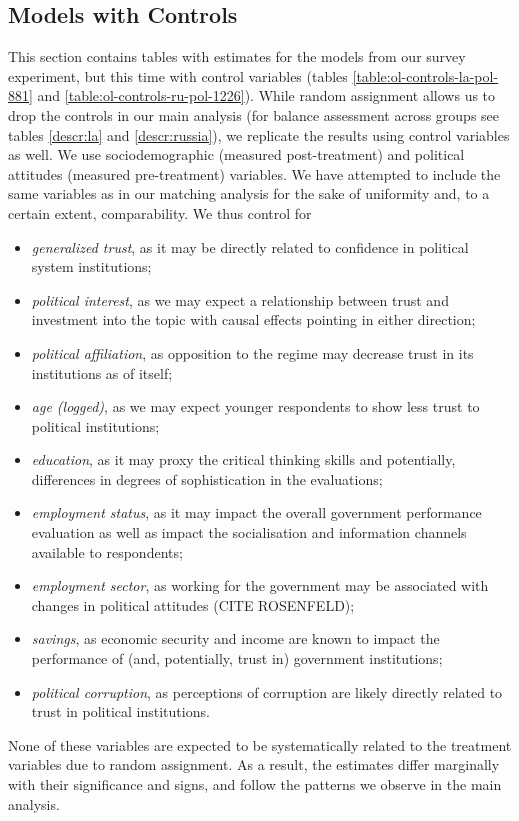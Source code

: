 \documentclass[11pt, ngerman,english,a4]{article}
\begin{document}
\clearpage
\subsection*{Models with Controls}

This section contains tables with estimates for the models from our survey experiment, but this time with control variables (tables \ref{table:ol-controls-la-pol-881} and \ref{table:ol-controls-ru-pol-1226}). While random assignment allows us to drop the controls in our main analysis (for balance assessment across groups see tables \ref{descr:la} and \ref{descr:russia}), we replicate the results using control variables as well. We use sociodemographic (measured post-treatment) and political attitudes (measured pre-treatment) variables. We have attempted to include the same variables as in our matching analysis for the sake of uniformity and, to a certain extent, comparability. We thus control for 
\begin{itemize}
	\item \textit{generalized trust}, as it may be directly related to confidence in political system institutions; 
	\item \textit{political interest}, as we may expect a relationship between trust and investment into the topic with causal effects pointing in either direction; 
	\item \textit{political affiliation}, as opposition to the regime may decrease trust in its institutions as of itself; 
	\item \textit{age (logged)}, as we may expect younger respondents to show less trust to political institutions;
	\item \textit{education}, as it may proxy the critical thinking skills and potentially, differences in degrees of sophistication in the evaluations; 
	\item \textit{employment status}, as it may impact the overall government performance evaluation as well as impact the socialisation and information channels available to respondents; 
	\item \textit{employment sector}, as working for the government may be associated with changes in political attitudes (CITE ROSENFELD);
	\item \textit{savings}, as economic security and income are known to impact the performance of (and, potentially, trust in) government institutions;
	\item \textit{political corruption}, as perceptions of corruption are likely directly related to trust in political institutions.
\end{itemize}
None of these variables are expected to be systematically related to the treatment variables due to random assignment. As a result, the estimates differ marginally with their significance and signs, and follow the patterns we observe in the main analysis.
\end{document}
